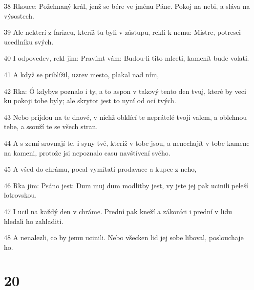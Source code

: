 \par 38 Rkouce: Požehnaný král, jenž se bére ve jménu Páne. Pokoj na nebi, a sláva na výsostech.
\par 39 Ale nekterí z farizeu, kteríž tu byli v zástupu, rekli k nemu: Mistre, potresci ucedlníku svých.
\par 40 I odpovedev, rekl jim: Pravímt vám: Budou-li tito mlceti, kamenít bude volati.
\par 41 A když se priblížil, uzrev mesto, plakal nad ním,
\par 42 Rka: Ó kdybys poznalo i ty, a to aspon v takový tento den tvuj, které by veci ku pokoji tobe byly; ale skrytot jest to nyní od ocí tvých.
\par 43 Nebo prijdou na te dnové, v nichž obklící te neprátelé tvoji valem, a oblehnou tebe, a ssouží te se všech stran.
\par 44 A s zemí srovnají te, i syny tvé, kteríž v tobe jsou, a nenechajít v tobe kamene na kameni, protože jsi nepoznalo casu navštívení svého.
\par 45 A všed do chrámu, pocal vymítati prodavace a kupce z neho,
\par 46 Rka jim: Psáno jest: Dum muj dum modlitby jest, vy jste jej pak ucinili peleší lotrovskou.
\par 47 I ucil na každý den v chráme. Prední pak kneží a zákoníci i prední v lidu hledali ho zahladiti.
\par 48 A nenalezli, co by jemu ucinili. Nebo všecken lid jej sobe liboval, poslouchaje ho.

\chapter{20}


